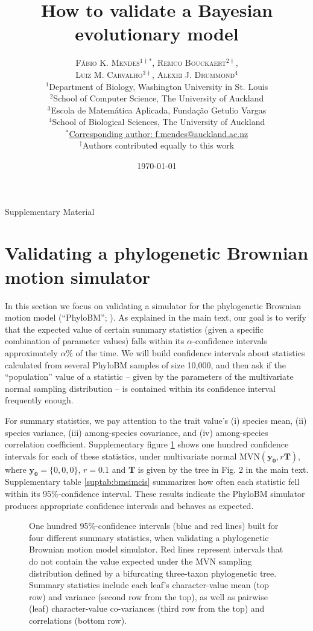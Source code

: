 \documentclass[oneside]{article}
\title{How to validate a Bayesian evolutionary model} %
\author{\textsc{F\'{a}bio K. Mendes$^{1\dagger*}$}, \textsc{Remco Bouckaert$^{2\dagger}$},\\
\textsc{Luiz M. Carvalho$^{3\dagger}$}, \textsc{Alexei J. Drummond$^{4}$} \\
\small $^1$Department of Biology, Washington University in St. Louis\\
\small $^2$School of Computer Science, The University of Auckland\\
\small $^3$Escola de Matem\'{a}tica Aplicada, Fundaç\~{a}o Getulio Vargas\\
\small $^4$School of Biological Sciences, The University of Auckland\\
\small
\href{mailto:f.mendes@auckland.ac.nz}{$^*$Corresponding author: f.mendes@auckland.ac.nz}\\
{\small $^\dagger$Authors contributed equally to this work}
}
\date{\today} %
\begin{document}
\maketitle

\begin{center}
    \Large Supplementary Material
\end{center}

\newpage

\section{Validating a phylogenetic Brownian motion simulator}

In this section we focus on validating a simulator for the phylogenetic Brownian motion model (``PhyloBM''; \citealp{felsenstein73}).
As explained in the main text, our goal is to verify that the expected value of certain summary statistics (given a specific combination of parameter values) falls within its $\alpha$-confidence intervals approximately $\alpha$\% of the time.
We will build confidence intervals about statistics calculated from several PhyloBM samples of size 10,000, and then ask if the ``population'' value of  a statistic -- given by the parameters of the multivariate normal sampling distribution -- is contained within its confidence interval frequently enough.

For summary statistics, we pay attention to the trait value's (i) species mean, (ii) species variance, (iii) among-species covariance, and (iv) among-species correlation coefficient.
Supplementary figure \ref{supfig:bmsimcis} shows one hundred confidence intervals for each of these statistics, under multivariate normal $\text{MVN}(\boldsymbol{y_0},r\boldsymbol{T})$, where $\boldsymbol{y_0}=\{0,0,0\}$, $r=0.1$ and $\boldsymbol{T}$ is given by the tree in Fig. 2 in the main text.
Supplementary table \ref{suptab:bmsimcis} summarizes how often each statistic fell within its 95\%-confidence interval.
These results indicate the PhyloBM simulator produces appropriate confidence intervals and behaves as expected.

\begin{figure}
  \centering
  
  \caption{One hundred 95\%-confidence intervals (blue and red lines) built for four different summary statistics, when validating a phylogenetic Brownian motion model simulator.
    Red lines represent intervals that do not contain the value expected under the MVN sampling distribution defined by a bifurcating three-taxon phylogenetic tree.
    Summary statistics include each leaf's character-value mean (top row) and variance (second row from the top), as well as pairwise (leaf) character-value co-variances (third row from the top) and correlations (bottom row).}
  \label{supfig:bmsimcis}
\end{figure}
\end{document}
